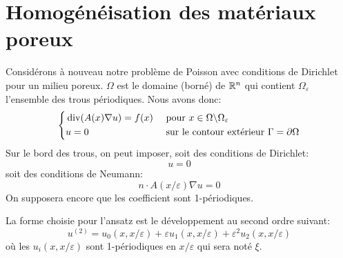 \section{Homogénéisation des matériaux poreux}
Considérons à nouveau notre problème de Poisson avec conditions de Dirichlet pour un milieu
poreux.
$\Omega$ est le domaine (borné) de $\mathbb R^n$ qui contient $\Omega_\varepsilon$ l'ensemble des trous
périodiques.
Nous avons donc:
\begin{equation}
\left\{
\begin{aligned}
&\operatorname{div}(A(x)\nabla u) = f(x) &&\text{ pour } x\in\Omega\backslash\Omega_\varepsilon\\
&u=0 && \text{ sur le contour extérieur } \Gamma=\partial\Omega\\
\end{aligned}
\right.
\end{equation}
Sur le bord des trous, on peut imposer, soit des conditions de Dirichlet:
\begin{equation}u=0 \end{equation}
soit des conditions de Neumann:
\begin{equation}n\cdot A(x/\varepsilon)\nabla u=0 \end{equation}
On supposera encore que les coefficient sont 1-périodiques.

\medskip
{}

La forme choisie pour l'ansatz est le développement au second ordre suivant:
\begin{equation}u^{(2)} = u_0(x,x/\varepsilon)+\varepsilon u_1(x,x/\varepsilon) + \varepsilon^2 u_2(x,x/\varepsilon)\end{equation}
où les $u_i(x,x/\varepsilon)$ sont 1-périodiques en $x/\varepsilon$ qui sera noté $\xi$.

